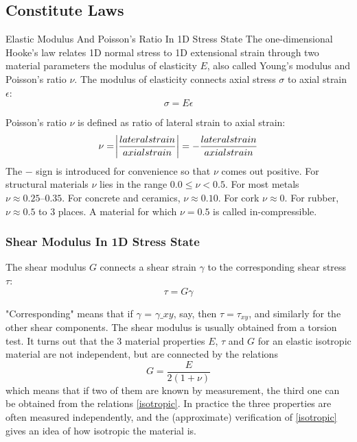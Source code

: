 \subsection{Constitute Laws}

Elastic Modulus And Poisson's Ratio In 1D Stress State
The one-dimensional Hooke’s law relates 1D normal stress to 1D extensional strain through two material parameters the modulus of elasticity $E$, also called Young’s modulus and Poisson’s ratio $\nu$. The modulus of elasticity connects axial stress $\sigma$ to axial strain $\epsilon$:
\begin{equation}
\sigma = E\epsilon \label{Hooke's law}
\end{equation}

Poisson's ratio $\nu$ is defined as ratio of lateral strain to axial strain:
\begin{equation}
\nu = \abs{\frac{lateral strain}{axial strain}} = -\frac{lateral strain}{axial strain}
\end{equation}
The $-$ sign is introduced for convenience so that $\nu$ comes out positive. For structural materials $\nu$ lies in the range $0.0 \leq \nu <0.5$. For most metals $\nu \approx 0.25–0.35$. For concrete and ceramics, $\nu \approx 0.10$. For cork $\nu \approx 0$. For rubber, $\nu \approx 0.5$ to 3 places. A material for which $\nu = 0.5$ is called in-compressible.

\subsubsection{Shear Modulus In 1D Stress State}
The shear modulus $G$ connects a shear strain $\gamma$ to the corresponding shear stress $\tau$:
\begin{equation}
\tau = G\gamma \label{Bulk modulus}
\end{equation} 

"Corresponding" means that if $\gamma$ = $\gamma \_{xy}$, say, then $\tau = \tau_{xy}$, and similarly for the other shear components. The shear modulus is usually obtained from a torsion test. It turns out that the 3 material properties $E$, $\tau$ and $G$ for an elastic isotropic material are not independent, but are connected by the relations
\begin{equation}
G = \frac{E}{2(1 + \nu)} \label{isotropic}
\end{equation}
which means that if two of them are known by measurement, the third one can be obtained from the relations \ref{isotropic}. In practice the three properties are often measured independently, and the (approximate) verification of \ref{isotropic} gives an idea of how isotropic the material is.


